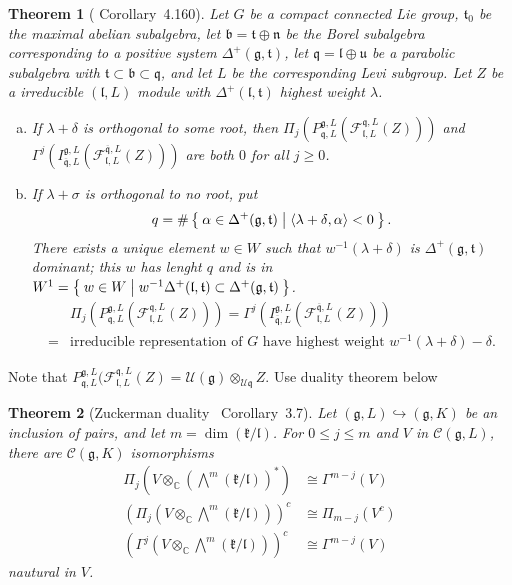 \documentclass[12pt]{article}
\newtheorem{thm}{Theorem}
\def\bC{{\mathbb{C}}}
\def\inn#1#2{\left\langle{#1},{#2}\right\rangle}
\def\fbb{\mathfrak{b}}
\def\fnn{\mathfrak{n}}
\def\fuu{\mathfrak{u}}
\def\fll{\mathfrak{l}}
\def\fqq{\mathfrak{q}}
\def\ftt{\mathfrak{t}}
\def\fgg{\mathfrak{g}}
\def\fkk{\mathfrak{k}}
\def\ccc{\mathcal{C}}
\def\cuu{\mathcal{U}}
\def\cff{\mathcal{F}}
\begin{document}
\begin{thm}[\cite{KnappVogan1995} Corollary~4.160]
Let $G$ be a compact connected Lie group, $\ftt_0$ be the maximal abelian 
subalgebra, let $\fbb=\ftt\oplus \fnn$ be the Borel subalgebra corresponding 
to a positive system $\Delta^+(\fgg,\ftt)$, let $\fqq=\fll\oplus \fuu$ 
be a parabolic subalgebra with $\ftt\subset \fbb \subset \fqq$, and let
$L$ be the corresponding Levi subgroup. Let $Z$ be a irreducible $(\fll,L)$
module with $\Delta^+(\fll,\ftt)$ highest weight $\lambda$. 
\begin{enumerate}[(a)]
\item If $\lambda+\delta$ is orthogonal to some root, 
then $\Pi_j(P_{\fqq,L}^{\fgg,L}(\cff_{\fll,L}^{\fqq,L}(Z)))$ and 
$\Gamma^j(I_{\overline{\fqq},L}^{\fgg,L}(\cff_{\fll,L}^{\overline{\fqq},L}(Z)))$
are both $0$ for all $j\geq 0$.
\item If $\lambda+\sigma$ is orthogonal to no root, put
\[
q=\#\Set{\alpha\in \Delta^+(\fgg,\ftt)|\inn{\lambda+\delta}{\alpha}<0}.
\]
There exists a unique element $w\in W$ such that 
$w^{-1}(\lambda+\delta)$ is $\Delta^+(\fgg,\ftt)$ dominant;
this $w$ has lenght $q$ and is in  
$W^1=\Set{w\in W|w^{-1} \Delta^+(\fll,\ftt)\subset \Delta^+(\fgg,\ftt)}$.
\[
\begin{split}
&\Pi_j(P_{\fqq,L}^{\fgg,L}(\cff_{\fll,L}^{\fqq,L}(Z)))=
\Gamma^j(I_{\overline{\fqq},L}^{\fgg,L}(\cff_{\fll,L}^{\overline{\fqq},L}(Z)))\\
=&\text{irreducible representation of $G$ have highest weight }
w^{-1}(\lambda+\delta)-\delta.
\end{split}
\]
\end{enumerate}
\end{thm}

Note that $P_{\fqq,L}^{\fgg,L}(\cff_{\fll,L}^{\fqq,L}(Z) 
= \cuu(\fgg)\otimes_{\cuu{\fqq}}Z$.
Use duality theorem below
\begin{thm}[Zuckerman duality \cite{KnappVogan1995}~Corollary~3.7]
Let $(\fgg,L)\hookrightarrow (\fgg,K)$ be an inclusion of pairs, 
and let $m=\dim(\fkk/\fll)$. For $0\leq j\leq m$ and $V$ in 
$\ccc(\fgg,L)$, there are $\ccc(\fgg,K)$ isomorphisms
\begin{align*}
\Pi_j(V\otimes_\bC (\bigwedge^m(\fkk/\fll))^*)&\cong \Gamma^{m-j}(V)\\
(\Pi_j(V\otimes_\bC \bigwedge^m(\fkk/\fll)))^c &\cong \Pi_{m-j}(V^c)\\
(\Gamma^j(V\otimes_\bC\bigwedge^m(\fkk/\fll)))^c& \cong \Gamma^{m-j}(V)
\end{align*} 
nautural in $V$.
\end{thm}
 
\end{document}
